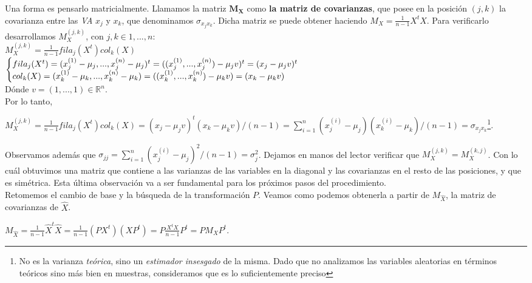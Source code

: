 Una forma es pensarlo matricialmente. Llamamos la matriz $\mathbf{M_{X}}$ como \textbf{la matriz de covarianzas}, que posee en la posici\'on $(j, k)$ la covarianza entre las \textit{VA} $x_{j}$ y $x_{k}$, que denominamos $\sigma_{x_{j}x_{k}}$. Dicha matriz se puede obtener haciendo $M_{X} = \frac{1}{n - 1}X^{t}X$. Para verificarlo desarrollamos  $M_{X}^{(j,k)}$, con $j,k \in {1, ..., n}$: \\

$M_{X}^{(j,k)} = \frac{1}{n - 1}fila_{j}(X^t)col_{k}(X)$ \\

$\Bigg\{
\begin{array}{@{}ll@{}}
	fila_{j}(X^t) = (x^{(1)}_{j} - \mu_{j}, ..., x^{(n)}_{j} - \mu_{j})^t = ((x^{(1)}_{j}, ..., x^{(n)}_{j}) - \mu_{j}v)^{t} = (x_{j} - \mu_{j}v)^{t} \\
	col_{k}(X) = (x^{(1)}_{k} - \mu_{k}, ..., x^{(n)}_{k} - \mu_{k}) = ((x^{(1)}_{k}, ..., x^{(n)}_{k}) - \mu_{k}v) = (x_{k} - \mu_{k}v)
\end{array}$ \\

D\'onde $v = (1, ..., 1) \in \mathbb{R}^{n}$. \\

Por lo tanto,

$M_{X}^{(j,k)} = \frac{1}{n - 1}fila_{j}(X^t)col_{k}(X) = (x_{j} - \mu_{j}v)^{t}(x_{k} - \mu_{k}v) / (n - 1) = \sum\limits_{i = 1}^{n}(x^{(i)}_{j} - \mu_{j})(x^{(i)}_{k} - \mu_{k}) / (n - 1) = \sigma_{x_{j}x_{k}}$\footnote{No es la varianza \textit{te\'orica}, sino un \textit{estimador insesgado} de la misma. Dado que no analizamos las variables aleatorias en t\'erminos te\'oricos sino m\'as bien en muestras, consideramos que es lo suficientemente preciso}.

Observamos adem\'as que $\sigma_{jj} = \sum\limits_{i = 1}^{n}(x_{j}^{(i)} - \mu_{j})^{2} / (n - 1) = \sigma_{j}^{2}$. Dejamos en manos del lector verificar que $M_{X}^{(j,k)} = M_{X}^{(k,j)}$. Con lo cu\'al obtuvimos una matriz que contiene a las varianzas de las variables en la diagonal y las covarianzas en el resto de las posiciones, y que es sim\'etrica. Esta \'ultima observaci\'on va a ser fundamental para los pr\'oximos pasos del procedimiento. \\

Retomemos el cambio de base y la b\'usqueda de la transformaci\'on $P$. Veamos como podemos obtenerla a partir de $M_{\hat{X}}$, la matriz de covarianzas de $\hat{X}$.

$M_{\hat{X}} = \frac{1}{n - 1}\hat{X}^{t}\hat{X} = \frac{1}{n - 1}(PX^{t})(XP^{t}) = P\frac{X^{t}X}{n - 1}P^{t} = PM_{X}P^{t}$.

